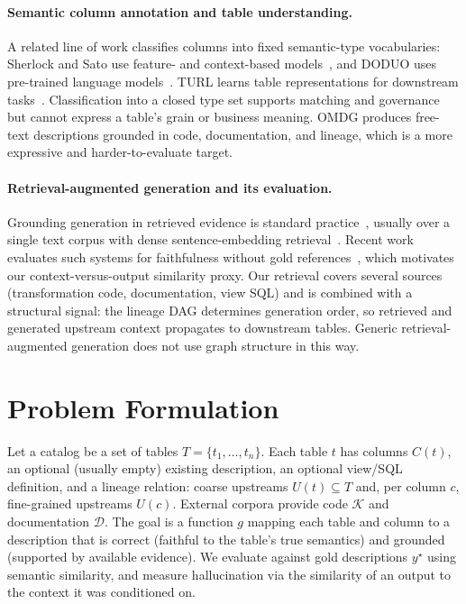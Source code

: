 \paragraph{Semantic column annotation and table understanding.} A related line of work
classifies columns into fixed semantic-type vocabularies: Sherlock and Sato use feature-
and context-based models~\citep{hulsebos2019sherlock,zhang2020sato}, and DODUO uses
pre-trained language models~\citep{suhara2022doduo}. TURL learns table representations for
downstream tasks~\citep{deng2020turl}. Classification into a closed type set supports
matching and governance but cannot express a table's grain or business meaning. OMDG
produces free-text descriptions grounded in code, documentation, and lineage, which is a
more expressive and harder-to-evaluate target.

\paragraph{Retrieval-augmented generation and its evaluation.} Grounding generation in
retrieved evidence is standard practice~\citep{lewis2020rag}, usually over a single text
corpus with dense sentence-embedding retrieval~\citep{reimers2019sentencebert}. Recent work
evaluates such systems for faithfulness without gold references~\citep{es2024ragas}, which
motivates our context-versus-output similarity proxy. Our retrieval covers several sources
(transformation code, documentation, view SQL) and is combined with a structural signal:
the lineage DAG determines generation order, so retrieved and generated upstream context
propagates to downstream tables. Generic retrieval-augmented generation does not use graph
structure in this way.

\section{Problem Formulation}
Let a catalog be a set of tables $T=\{t_1,\dots,t_n\}$. Each table $t$ has columns
$C(t)$, an optional (usually empty) existing description, an optional view/SQL definition,
and a lineage relation: coarse upstreams $U(t)\subseteq T$ and, per column $c$,
fine-grained upstreams $U(c)$. External corpora provide code $\mathcal{K}$ and
documentation $\mathcal{D}$. The goal is a function $g$ mapping each table and column to a
description that is correct (faithful to the table's true semantics) and grounded
(supported by available evidence). We evaluate against gold descriptions $y^\star$ using
semantic similarity, and measure hallucination via the similarity of an output to the
context it was conditioned on.

